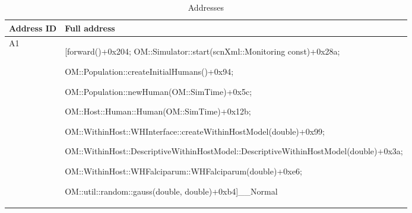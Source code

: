 \documentclass{article}
\begin{document}
  \begin{table}[h!]
  \footnotesize
  \setlength{\tabcolsep}{1mm}
  \caption{Addresses }
  \label{table:addresses}
  \def\arraystretch{1.25}
  \begin{tabularx}{\textwidth}{@{}lX@{}} 
    \toprule
    Address ID & Full address \\
    \midrule
  A1 & [forward()+0x204; OM::Simulator::start(scnXml::Monitoring const)+0x28a;

  OM::Population::createInitialHumans()+0x94; 

  OM::Population::newHuman(OM::SimTime)+0x5c;

  OM::Host::Human::Human(OM::SimTime)+0x12b;

  OM::WithinHost::WHInterface::createWithinHostModel(double)+0x99;

  OM::WithinHost::DescriptiveWithinHostModel::DescriptiveWithinHostModel(double)+0x3a;

  OM::WithinHost::WHFalciparum::WHFalciparum(double)+0xe6; 

  OM::util::random::gauss(double, double)+0xb4]\_\_Normal\\













\end{tabularx}
\end{table}
\end{document}
